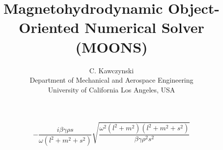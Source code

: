 \documentclass[11pt]{article}
\begin{document}
\doublespacing
\title{Magnetohydrodynamic Object-Oriented Numerical Solver (MOONS)}
\author{C. Kawczynski \\
Department of Mechanical and Aerospace Engineering \\
University of California Los Angeles, USA\\
}
\maketitle

\begin{equation}- \frac{i \beta  \gamma  \rho  s}{\omega  \left(l^{2} + m^{2} + s^{2}\right)} \sqrt{\frac{\omega ^{2} \left(l^{2} + m^{2}\right) \left(l^{2} + m^{2} + s^{2}\right)}{\beta  \gamma  \rho ^{2} s^{2}}}\end{equation}
\end{document}
